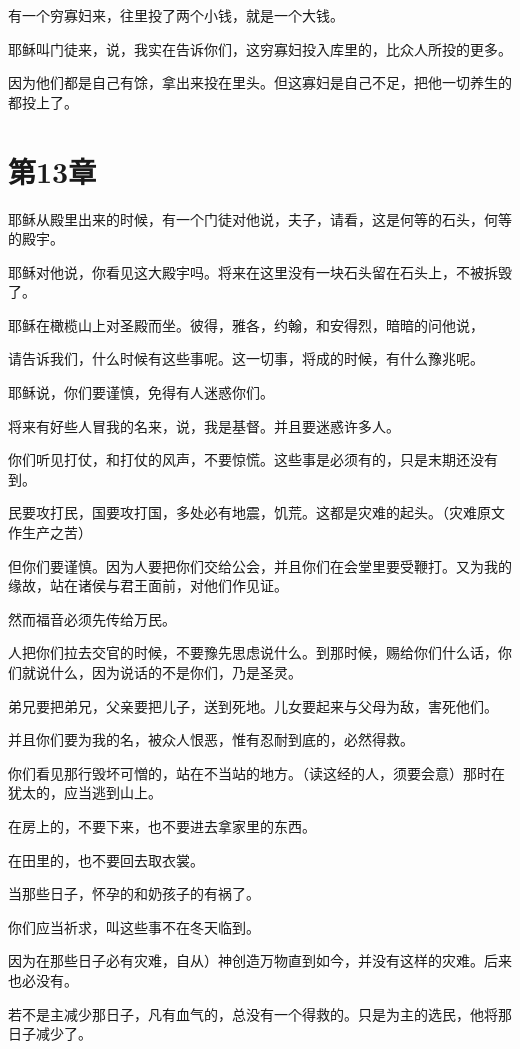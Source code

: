 \documentclass[12pt,oneside]{book}
\begin{document}
有一个穷寡妇来，往里投了两个小钱，就是一个大钱。

耶稣叫门徒来，说，我实在告诉你们，这穷寡妇投入库里的，比众人所投的更多。

因为他们都是自己有馀，拿出来投在里头。但这寡妇是自己不足，把他一切养生的都投上了。

\chapter{第13章}
耶稣从殿里出来的时候，有一个门徒对他说，夫子，请看，这是何等的石头，何等的殿宇。

耶稣对他说，你看见这大殿宇吗。将来在这里没有一块石头留在石头上，不被拆毁了。

耶稣在橄榄山上对圣殿而坐。彼得，雅各，约翰，和安得烈，暗暗的问他说，

请告诉我们，什么时候有这些事呢。这一切事，将成的时候，有什么豫兆呢。

耶稣说，你们要谨慎，免得有人迷惑你们。

将来有好些人冒我的名来，说，我是基督。并且要迷惑许多人。

你们听见打仗，和打仗的风声，不要惊慌。这些事是必须有的，只是末期还没有到。

民要攻打民，国要攻打国，多处必有地震，饥荒。这都是灾难的起头。（灾难原文作生产之苦）

但你们要谨慎。因为人要把你们交给公会，并且你们在会堂里要受鞭打。又为我的缘故，站在诸侯与君王面前，对他们作见证。

然而福音必须先传给万民。

人把你们拉去交官的时候，不要豫先思虑说什么。到那时候，赐给你们什么话，你们就说什么，因为说话的不是你们，乃是圣灵。

弟兄要把弟兄，父亲要把儿子，送到死地。儿女要起来与父母为敌，害死他们。

并且你们要为我的名，被众人恨恶，惟有忍耐到底的，必然得救。

你们看见那行毁坏可憎的，站在不当站的地方。（读这经的人，须要会意）那时在犹太的，应当逃到山上。

在房上的，不要下来，也不要进去拿家里的东西。

在田里的，也不要回去取衣裳。

当那些日子，怀孕的和奶孩子的有祸了。

你们应当祈求，叫这些事不在冬天临到。

因为在那些日子必有灾难，自从）神创造万物直到如今，并没有这样的灾难。后来也必没有。

若不是主减少那日子，凡有血气的，总没有一个得救的。只是为主的选民，他将那日子减少了。
\end{document}
